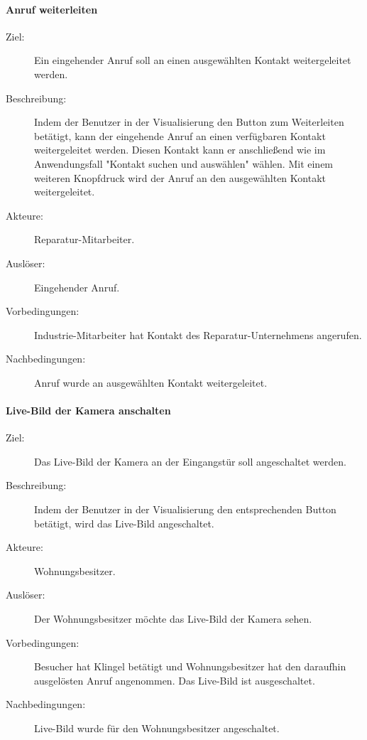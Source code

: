 \paragraph{Anruf weiterleiten}
    \begin{description}
        \item[Ziel:] Ein eingehender Anruf soll an einen ausgewählten Kontakt weitergeleitet werden.
        \item[Beschreibung:] Indem der Benutzer in der Visualisierung den Button zum Weiterleiten betätigt, kann der eingehende Anruf an einen verfügbaren Kontakt weitergeleitet werden.
            Diesen Kontakt kann er anschließend wie im Anwendungsfall "Kontakt suchen und auswählen" wählen.
            Mit einem weiteren Knopfdruck wird der Anruf an den ausgewählten Kontakt weitergeleitet.
        \item[Akteure:] Reparatur-Mitarbeiter.
        \item[Auslöser:] Eingehender Anruf.
        \item[Vorbedingungen:] Industrie-Mitarbeiter hat Kontakt des Reparatur-Unternehmens angerufen.
        \item[Nachbedingungen:] Anruf wurde an ausgewählten Kontakt weitergeleitet.
    \end{description}

\paragraph{Live-Bild der Kamera anschalten}
    \begin{description}
        \item[Ziel:] Das Live-Bild der Kamera an der Eingangstür soll angeschaltet werden.
        \item[Beschreibung:] Indem der Benutzer in der Visualisierung den entsprechenden Button betätigt, wird das Live-Bild angeschaltet.
        \item[Akteure:] Wohnungsbesitzer.
        \item[Auslöser:] Der Wohnungsbesitzer möchte das Live-Bild der Kamera sehen.
        \item[Vorbedingungen:] Besucher hat Klingel betätigt und Wohnungsbesitzer hat den daraufhin ausgelösten Anruf angenommen.
            Das Live-Bild ist ausgeschaltet.
        \item[Nachbedingungen:] Live-Bild wurde für den Wohnungsbesitzer angeschaltet.
    \end{description}

